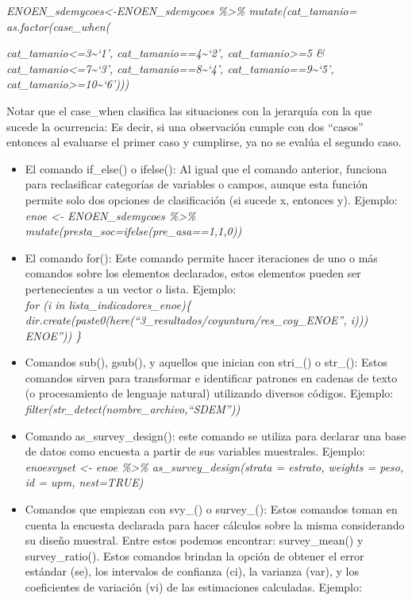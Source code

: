 \documentclass[
]{article}
\begin{document}
\emph{ENOEN\_sdemycoes\textless-ENOEN\_sdemycoes \%\textgreater\% mutate(cat\_tamanio= as.factor(case\_when(}

\emph{cat\_tamanio\textless=3\textasciitilde{}`1', cat\_tamanio==4\textasciitilde{}`2', cat\_tamanio\textgreater=5 \& cat\_tamanio\textless=7\textasciitilde{}`3', cat\_tamanio==8\textasciitilde{}`4', cat\_tamanio==9\textasciitilde{}`5', cat\_tamanio\textgreater=10\textasciitilde{}`6')))}

Notar que el case\_when clasifica las situaciones con la jerarquía con la que sucede la ocurrencia: Es decir, si una observación cumple con dos ``casos'' entonces al evaluarse el primer caso y cumplirse, ya no se evalúa el segundo caso.

\begin{itemize}
\item
  El comando if\_else() o ifelse(): Al igual que el comando anterior, funciona para reclasificar categorías de variables o campos, aunque esta función permite solo dos opciones de clasificación (si sucede x, entonces y). Ejemplo:\\
  \emph{enoe \textless- ENOEN\_sdemycoes \%\textgreater\% mutate(presta\_soc=ifelse(pre\_asa==1,1,0))}
\item
  El comando for(): Este comando permite hacer iteraciones de uno o más comandos sobre los elementos declarados, estos elementos pueden ser pertenecientes a un vector o lista. Ejemplo:\\
  \emph{for (i in lista\_indicadores\_enoe)\{}\\
  \emph{dir.create(paste0(here(``3\_resultados/coyuntura/res\_coy\_ENOE'', i)))}\\
  \emph{ENOE'')) \}}
\item
  Comandos sub(), gsub(), y aquellos que inician con stri\_() o str\_(): Estos comandos sirven para transformar e identificar patrones en cadenas de texto (o procesamiento de lenguaje natural) utilizando diversos códigos. Ejemplo:\\
  \emph{filter(str\_detect(nombre\_archivo,``SDEM''))}
\item
  Comando as\_survey\_design(): este comando se utiliza para declarar una base de datos como encuesta a partir de sus variables muestrales. Ejemplo:\\
  \emph{enoesvyset \textless- enoe \%\textgreater\% as\_survey\_design(strata = estrato, weights = peso, id = upm, nest=TRUE)}
\item
  Comandos que empiezan con svy\_() o survey\_(): Estos comandos toman en cuenta la encuesta declarada para hacer cálculos sobre la misma considerando su diseño muestral. Entre estos podemos encontrar: survey\_mean() y survey\_ratio(). Estos comandos brindan la opción de obtener el error estándar (se), los intervalos de confianza (ci), la varianza (var), y los coeficientes de variación (vi) de las estimaciones calculadas. Ejemplo:\\

\end{itemize}
\end{document}
